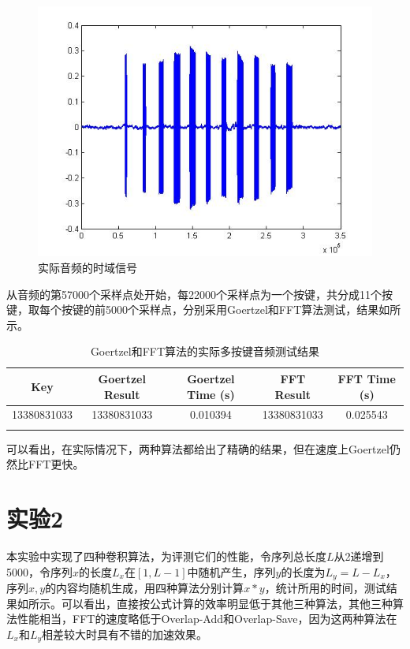 \documentclass[12pt,a4paper]{article}
\begin{document}
\begin{figure}[htbp]
    \centering
    \includegraphics[width=\textwidth]{fig/phone_number.jpg}
    \caption{实际音频的时域信号}
    \label{fig:phone_number}
\end{figure}

从音频的第57000个采样点处开始，每22000个采样点为一个按键，共分成11个按键，取每个按键的前5000个采样点，分别采用Goertzel和FFT算法测试，结果如所示。

\begin{longtable}[]{c|cccc}
    \toprule
    Key & Goertzel Result & Goertzel Time (s) & FFT Result & FFT
    Time (s)\tabularnewline
    \midrule
    \endhead
    13380831033 & 13380831033 & 0.010394 & 13380831033 &
    0.025543\tabularnewline
    \bottomrule
    \caption{Goertzel和FFT算法的实际多按键音频测试结果}
    \label{tab:practical}
\end{longtable}

可以看出，在实际情况下，两种算法都给出了精确的结果，但在速度上Goertzel仍然比FFT更快。

\section{实验2}

本实验中实现了四种卷积算法，为评测它们的性能，令序列总长度$L$从2递增到5000，令序列$x$的长度$L_x$在$[1, L-1]$中随机产生，序列$y$的长度为$L_y = L - L_x$，序列$x,y$的内容均随机生成，用四种算法分别计算$x*y$，统计所用的时间，测试结果如所示。可以看出，直接按公式计算的效率明显低于其他三种算法，其他三种算法性能相当，FFT的速度略低于Overlap-Add和Overlap-Save，因为这两种算法在$L_x$和$L_y$相差较大时具有不错的加速效果。
\end{document}
